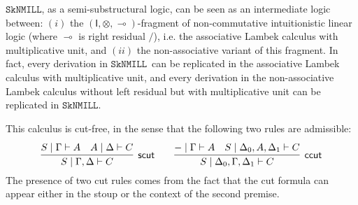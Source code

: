 \documentclass[sn-mathphys-num]{sn-jnl}%
\newcommand{\GG}{\Gamma}
\newcommand{\GD}{\Delta}
\newcommand{\vd}{\vdash}
\newcommand{\pass}{\mathsf{pass}}
\newcommand{\ax}{\mathsf{ax}}
\newcommand{\ot}{\otimes}
\newcommand{\lolli}{\multimap}
\newcommand{\lleft}{{\lolli}\mathsf{L}}
\newcommand{\lright}{{\lolli}\mathsf{R}}
\newcommand{\unit}{\mathsf{I}}
\newcommand{\sls}{\slash}
\newcommand{\SkNMILL}{$\mathtt{SkNMILL}$}
\theoremstyle{thmstyleone}%
\theoremstyle{thmstyletwo}%
\theoremstyle{thmstylethree}%
\begin{document}
\SkNMILL, as a semi-substructural logic, can be seen as an intermediate logic between: $(i)$ the $(\unit,\ot,\lolli)$-fragment of non-commutative intuitionistic linear logic (where $\lolli$ is right residual $\sls$), i.e. the associative Lambek calculus with multiplicative unit, and $(ii)$ the non-associative variant of this fragment.
In fact, every derivation in \SkNMILL~can be replicated in the associative Lambek calculus with multiplicative unit, and every derivation in the non-associative Lambek calculus without left residual but with multiplicative unit can be replicated in \SkNMILL.


This calculus is cut-free, in the sense that the following two rules are admissible:
\begin{equation}\label{eq:cut}
  \infer[\mathsf{scut}]{S \mid \GG , \GD \vd C}{
  \deduce{S \mid \GG \vd A}{}
  &
  \deduce{A \mid \GD \vd C}{}
  }
  \qquad
  \infer[\mathsf{ccut}]{S \mid \GD_0 , \GG , \GD_1 \vd C}{
  \deduce{{-} \mid \GG \vd A}{}
  &
  \deduce{S \mid \GD_0 , A , \GD_1 \vd C}{}
  }
\end{equation}
The presence of two cut rules comes from the fact that the cut formula can appear either in the stoup or the context of the second premise.
\end{document}

